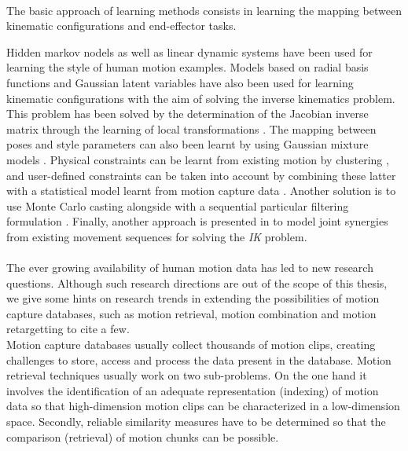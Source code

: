 						\\

The basic approach of learning methods consists in learning the mapping between kinematic configurations and end-effector tasks.

Hidden markov nodels  as well as linear dynamic systems  have been used for learning the style of human motion examples. Models based on radial basis functions  and Gaussian latent variables  have also been used for learning kinematic configurations with the aim of solving the inverse kinematics problem. This problem has been solved by the determination of the Jacobian inverse matrix through the learning of local transformations . The mapping between poses and style parameters can also been learnt by using Gaussian mixture models . Physical constraints can be learnt from existing motion by clustering , and user-defined constraints can be taken into account by combining these latter with a statistical model learnt from motion capture data . Another solution is to use Monte Carlo casting alongside with a sequential particular filtering formulation . Finally, another approach is presented in  to model joint synergies from existing movement sequences for solving the \emph{IK} problem.\\



						\\

The ever growing availability of human motion data  has led to new research questions. Although such research directions are out of the scope of this thesis, we give some hints on research trends in extending the possibilities of motion capture databases, such as motion retrieval, motion combination and motion retargetting to cite a few.\\

Motion capture databases usually collect thousands of motion clips, creating challenges to store, access and process the data present in the database. Motion retrieval techniques usually work on two sub-problems. On the one hand it involves the identification of an adequate representation (indexing) of motion data so that high-dimension motion clips can be characterized in a low-dimension space. Secondly, reliable similarity measures have to be determined so that the comparison (retrieval) of motion chunks can be possible. %

